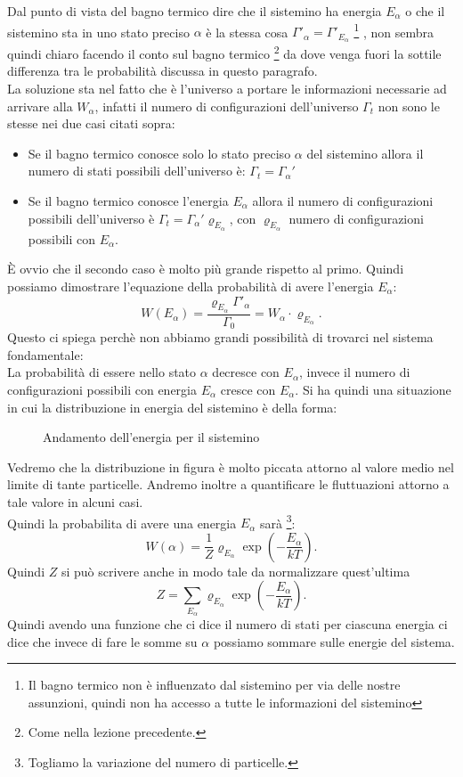 Dal punto di vista del bagno termico dire che il sistemino ha energia $E_{\alpha}$ o che il sistemino sta in uno stato preciso $\alpha$ è la stessa cosa $\Gamma'_\alpha  = \Gamma'_{E_\alpha}$
\footnote{Il bagno termico non è influenzato dal sistemino per via delle nostre assunzioni, quindi non ha accesso a tutte le informazioni del sistemino}
, non sembra quindi chiaro facendo il conto sul bagno termico \footnote{Come nella lezione precedente.} da dove venga fuori la sottile differenza tra le probabilità discussa in questo paragrafo.\\
La soluzione sta nel fatto che è l'universo a portare le informazioni necessarie ad arrivare alla $W_{\alpha}$, infatti il numero di configurazioni dell'universo $\Gamma_{t}$ non sono le stesse nei due casi citati sopra:
\begin{itemize}
	\item Se il bagno termico conosce solo lo stato preciso $\alpha$ del sistemino allora il numero di stati possibili dell'universo è: $\Gamma_{t}= \Gamma_{\alpha}'$
	\item Se il bagno termico conosce l'energia $E_{\alpha}$ allora il numero di configurazioni possibili dell'universo è $\Gamma_{t}= \Gamma_{\alpha}' \varrho_{E_{\alpha}}$, con $\varrho_{E_{\alpha}}$ numero di configurazioni possibili con $E_{\alpha}$.
\end{itemize}
È ovvio che il secondo caso è molto più grande rispetto al primo. Quindi possiamo dimostrare l'equazione della probabilità di avere l'energia $E_{\alpha}$:
\[
	W\left( E_{\alpha} \right)  = \frac{\varrho_{E_\alpha}\Gamma'_{\alpha}}{\Gamma_0} = W_{\alpha}\cdot \varrho_{E_{\alpha}}
.\] 
Questo ci spiega perchè non abbiamo grandi possibilità di trovarci nel sistema fondamentale: \\
La probabilità di essere nello stato $\alpha$ decresce con $E_{\alpha}$, invece il numero di configurazioni possibili con energia $E_{\alpha}$ cresce con $E_{\alpha}$. Si ha quindi una situazione in cui la distribuzione in energia del sistemino è della forma:
\begin{figure}[H]
    \centering
    \caption{Andamento dell'energia per il sistemino}
    \label{fig:andamento-energia-sistemino}
\end{figure}
\noindent
Vedremo che la distribuzione in figura è molto piccata attorno al valore medio nel limite di tante particelle. Andremo inoltre a quantificare le fluttuazioni attorno a tale valore in alcuni casi.\\
Quindi la probabilita di avere una energia $E_{\alpha}$ sarà \footnote{Togliamo la variazione del numero di particelle.}:
\[
    W({\alpha}) = \frac{1}{Z} \varrho_{E_{\alpha}} \exp\left( -\frac{E_{\alpha}}{kT} \right) 
.\]
Quindi $Z$ si può scrivere anche in modo tale da normalizzare quest'ultima 
\[
	Z = \sum_{E_{\alpha}}^{} \varrho_{E_{\alpha}}\exp\left( -\frac{E_{\alpha}}{kT} \right) 
.\] 
Quindi avendo una funzione che ci dice il numero di stati per ciascuna energia ci dice che invece di fare le somme su $\alpha$ possiamo sommare sulle energie del sistema.\\

